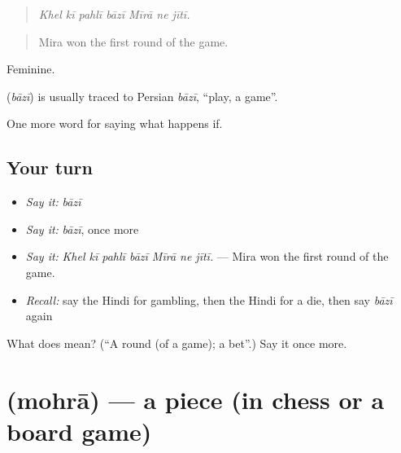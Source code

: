 \begin{quote}
      
\end{quote}

\begin{quote}
\emph{Khel kī pahlī bāzī Mīrā ne jītī.}
\end{quote}

\begin{quote}
Mira won the first round of the game.
\end{quote}

Feminine.

\begin{cousinweb}
\textbf{} (\emph{bāzī}) is usually traced to Persian \emph{bāzī}, \textquotedblleft{}play, a game\textquotedblright{}.
\end{cousinweb}

\begin{grammarlens}[title={What you've built}]
One more word for saying what happens if.
\end{grammarlens}

\subsection*{Your turn}
\begin{itemize}
\raggedright
  \item \emph{Say it:} \emph{bāzī}
  \item \emph{Say it:} \emph{bāzī}, once more
  \item \emph{Say it:} \emph{Khel kī pahlī bāzī Mīrā ne jītī.} — Mira won the first round of the game.
  \item \emph{Recall:} say the Hindi for gambling, then the Hindi for a die, then say \emph{bāzī} again
\end{itemize}

\begin{tcolorbox}[breakable,colback=teal!4,colframe=teal!35!black,title={Before you move on}]
What does  mean? (\textquotedblleft{}A round (of a game); a bet\textquotedblright{}.) Say it once more.
\end{tcolorbox}
\section[\texorpdfstring{\hi{मोहरा} (mohrā)}{मोहरा (mohrā)}]{ (mohrā) — a piece (in chess or a board game)}

\label{lesson:HI-C545-mohra}



